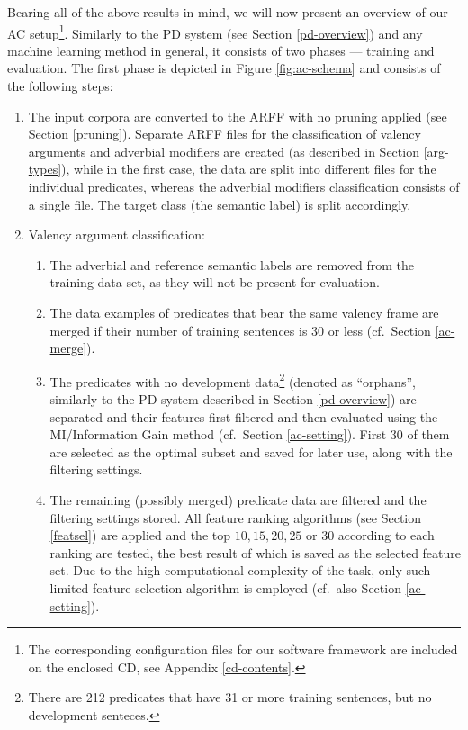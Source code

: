\documentclass[12pt,notitlepage,a4paper]{report}
\begin{document}
Bearing all of the above results in mind, we will now present an overview of our AC setup\footnote{The corresponding configuration files for our software framework are included on the enclosed CD, see Appendix \ref{cd-contents}.}. Similarly to the PD system (see Section \ref{pd-overview}) and any machine learning method in general, it consists of two phases --- training and evaluation. The first phase is depicted in Figure \ref{fig:ac-schema} and consists of the following steps:
\begin{enumerate}
    \item The input corpora are converted to the ARFF with no pruning applied (see Section \ref{pruning}). Separate ARFF files for the classification of valency arguments and adverbial modifiers are created (as described in Section \ref{arg-types}), while in the first case, the data are split into different files for the individual predicates, whereas the adverbial modifiers classification consists of a single file. The target class (the semantic label) is split accordingly.
    \item Valency argument classification:
    \begin{enumerate}
        \item The adverbial and reference semantic labels are removed from the training data set, as they will not be present for evaluation.
        \item The data examples of predicates that bear the same valency frame are merged if their number of training sentences is 30 or less (cf.\ Section \ref{ac-merge}).
        \item The predicates with no development data\footnote{There are 212 predicates that have 31 or more training sentences, but no development senteces.} (denoted as ``orphans'', similarly to the PD system described in Section \ref{pd-overview}) are separated and their features first filtered and then evaluated using the MI/Information Gain method (cf.\ Section \ref{ac-setting}). First 30 of them are selected as the optimal subset and saved for later use, along with the filtering settings.
        \item The remaining (possibly merged) predicate data are filtered and the filtering settings stored. All feature ranking algorithms (see Section \ref{featsel}) are applied and the top $10,15,20,25$ or $30$ according to each ranking are tested, the best result of which is saved as the selected feature set. Due to the high computational complexity of the task, only such limited feature selection algorithm is employed (cf.\ also Section \ref{ac-setting}).

\end{enumerate}
\end{enumerate}
\end{document}
